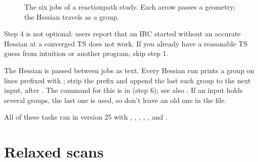 \documentclass[letterpaper,10pt,english,openany,oneside]{sphinxmanual}
\begin{document}
\begin{figure}[htbp]
\centering
\capstart

\caption{The six jobs of a reaction\sphinxhyphen{}path study. Each arrow passes a geometry; the Hessian travels as a  group.}\label{\detokenize{tasks/ts-irc-scan:id4}}\end{figure}



\sphinxAtStartPar
Step 4 is not optional: users report that an IRC started without an accurate Hessian at a converged TS does not
work. If you already have a reasonable TS guess from intuition or another program, skip step 1.



\sphinxAtStartPar
The Hessian is passed between jobs as text. Every Hessian run prints a  group on lines prefixed with
; strip the prefix and append the last such group to the next input, after . The command for this
is in {\hyperref[\detokenize{start/getting-started:start-getting-started}]{}} (step 6); see also {\hyperref[\detokenize{reference/Energy:group-energy}]{}}. If an input holds several
 groups, the last one is used, so don’t leave an old one in the file.



\sphinxAtStartPar
All of these tasks ran in version 25 with  , , , , ,  and .




\section{Relaxed scans}
\label{\detokenize{tasks/ts-irc-scan:relaxed-scans}}
\end{document}
